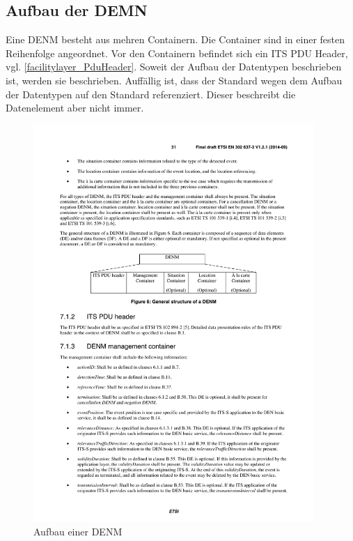 \subsection{Aufbau der DEMN}
Eine \ac{DENM} besteht aus mehren Containern. Die Container sind in einer festen Reihenfolge angeordnet.  Vor den Containern befindet sich ein \ac{ITS} PDU Header, vgl. \autoref{facilitylayer_PduHeader}. Soweit der Aufbau der Datentypen beschrieben ist, werden sie beschrieben. Auffällig ist, dass der Standard \cite{en302637-3} wegen dem Aufbau der Datentypen auf den Standard \cite{ts102894-2} referenziert. Dieser beschreibt die Datenelement aber nicht immer.

\begin{figure}[htbp]
	\includegraphics[width=0.95\textwidth]{content/images/04_facilitylayer/denmAufbau.pdf}
	\caption{Aufbau einer DENM \cite{en302637-3}}
	\label{fig:darstellungdenmAufbau}
\end{figure}

